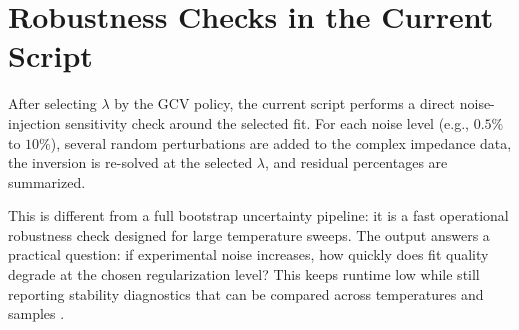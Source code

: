 \documentclass[11pt]{article}
\begin{document}
\section{Robustness Checks in the Current Script}

After selecting $\lambda$ by the GCV policy, the current script performs a direct noise-injection sensitivity check around the selected fit. For each noise level (e.g., $0.5\%$ to $10\%$), several random perturbations are added to the complex impedance data, the inversion is re-solved at the selected $\lambda$, and residual percentages are summarized.

This is different from a full bootstrap uncertainty pipeline: it is a fast operational robustness check designed for large temperature sweeps. The output answers a practical question: if experimental noise increases, how quickly does fit quality degrade at the chosen regularization level? This keeps runtime low while still reporting stability diagnostics that can be compared across temperatures and samples \cite{tuncer2001,saccoccio2014,maradesa2023,carbone2025}.
\end{document}
